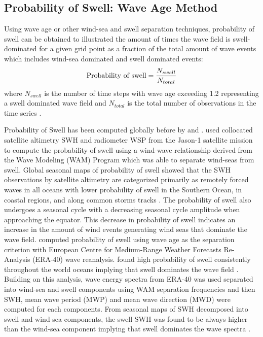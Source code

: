 \documentclass[12pt,twoside]{article}
\begin{document}
\subsection{Probability of Swell: Wave Age Method}

Using wave age or other wind-sea and swell separation techniques, probability of swell can be obtained to illustrated the amount of times the wave field is swell-dominated for a given grid point as a fraction of the total amount of wave events which includes wind-sea dominated and swell dominated events:
\begin{equation}
    \mbox{\rm Probability of swell} = \frac{N_{swell}}{N_{total}}
\end{equation}
where $N_{swell}$ is the number of time steps with wave age exceeding 1.2 representing a swell dominated wave field and $N_{total}$ is the total number of observations in the time series .

Probability of Swell has been computed globally before by \citet{jiang2013global} and \citet{semedo2011global}.  \citet{jiang2013global} used collocated satellite altimetry SWH and radiometer WSP from the Jason-1 satellite mission to compute the probability of swell using a wind-wave relationship derived from the Wave Modeling (WAM) Program which was able to separate wind-seas from swell. Global seasonal maps of probability of swell showed that the SWH observations by satellite altimetry are categorized primarily as remotely forced waves in all oceans with lower probability of swell in the Southern Ocean, in coastal regions, and along common storms tracks \cite{jiang2013global}. The probability of swell also undergoes a seasonal cycle with a decreasing seasonal cycle amplitude when approaching the equator. This decrease in probability of swell indicates an increase in the amount of wind events generating wind seas that dominate the wave field. \citet{semedo2011global} computed probability of swell using wave age as the separation criterion with European Centre for Medium-Range Weather Forecasts Re-Analysis (ERA-40) wave reanalysis. \citet{semedo2011global} found high probability of swell consistently throughout the world oceans implying that swell dominates the wave field \cite{semedo2011global}. Building on this analysis, wave energy spectra from ERA-40 was used separated into wind-sea and swell components using WAM separation frequencies and then SWH, mean wave period (MWP) and mean wave direction (MWD) were computed for each components. From seasonal maps of SWH decomposed into swell and wind sea components, the swell SWH was found to be always higher than the wind-sea component implying that swell dominates the wave spectra \cite{semedo2011global}. 
\end{document}
